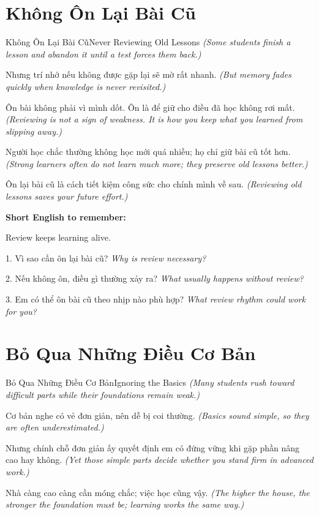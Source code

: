 \section{Không Ôn Lại Bài Cũ}
\begin{truyen}{Không Ôn Lại Bài Cũ}{Never Reviewing Old Lessons}
\textit{(Some students finish a lesson and abandon it until a test forces them back.)}

Nhưng trí nhớ nếu không được gặp lại sẽ mờ rất nhanh.
\textit{(But memory fades quickly when knowledge is never revisited.)}

Ôn bài không phải vì mình dốt. Ôn là để giữ cho điều đã học không rơi mất.
\textit{(Reviewing is not a sign of weakness. It is how you keep what you learned from slipping away.)}

Người học chắc thường không học mới quá nhiều; họ chỉ giữ bài cũ tốt hơn.
\textit{(Strong learners often do not learn much more; they preserve old lessons better.)}
\end{truyen}

\begin{baihoc}
Ôn lại bài cũ là cách tiết kiệm công sức cho chính mình về sau.
\textit{(Reviewing old lessons saves your future effort.)}
\end{baihoc}

\begin{ghinhoanh}
\textbf{Short English to remember:}

Review keeps learning alive.

\end{ghinhoanh}

\begin{tuhocnhanh}
1. Vì sao cần ôn lại bài cũ? \textit{Why is review necessary?}

2. Nếu không ôn, điều gì thường xảy ra? \textit{What usually happens without review?}

3. Em có thể ôn bài cũ theo nhịp nào phù hợp? \textit{What review rhythm could work for you?}
\end{tuhocnhanh}
\ngancach

\section{Bỏ Qua Những Điều Cơ Bản}
\begin{truyen}{Bỏ Qua Những Điều Cơ Bản}{Ignoring the Basics}
\textit{(Many students rush toward difficult parts while their foundations remain weak.)}

Cơ bản nghe có vẻ đơn giản, nên dễ bị coi thường.
\textit{(Basics sound simple, so they are often underestimated.)}

Nhưng chính chỗ đơn giản ấy quyết định em có đứng vững khi gặp phần nâng cao hay không.
\textit{(Yet those simple parts decide whether you stand firm in advanced work.)}

Nhà càng cao càng cần móng chắc; việc học cũng vậy.
\textit{(The higher the house, the stronger the foundation must be; learning works the same way.)}
\end{truyen}

